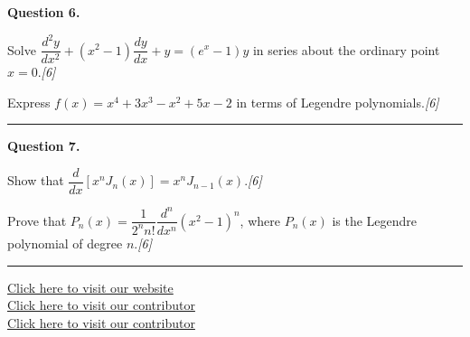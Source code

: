 \documentclass[11pt,a4paper]{article}
\newcommand{\pts}[1]{\hfill   \textit{[#1]}}
\begin{document}
\noindent   \textbf{Question 6.}

\begin{parts}
  \item Solve $\dfrac{d^2y}{dx^2}+(x^2-1)\dfrac{dy}{dx}+y=(e^x-1)y$ in series about the ordinary point $x=0$.\pts{6}
  \item Express $f(x)=x^4+3x^3-x^2+5x-2$ in terms of Legendre polynomials.\pts{6}
\end{parts}
\medskip\rule{\linewidth}{0.2pt}

\medskip


\noindent   \textbf{Question 7.}

\begin{parts}
  \item Show that $\dfrac{d}{dx}\left[x^n J_n(x)\right]=x^n J_{n-1}(x)$.\pts{6}
  \item Prove that $P_n(x)=\dfrac{1}{2^n n!}\dfrac{d^n}{dx^n}(x^2-1)^n$, where $P_n(x)$ is the Legendre polynomial of degree $n$.\pts{6}
\end{parts}

\vfill\rule{\linewidth}{0.4pt}

\begin{center}\small
\href{https://bhu-exam.vercel.app/}{Click here to visit our website}\\[4pt]
\href{https://me-aryan.vercel.app/}{Click here to visit our contributor}\\[4pt]
\href{https://quashan-me.vercel.app/}{Click here to visit our contributor}
\end{center}
\end{document}
